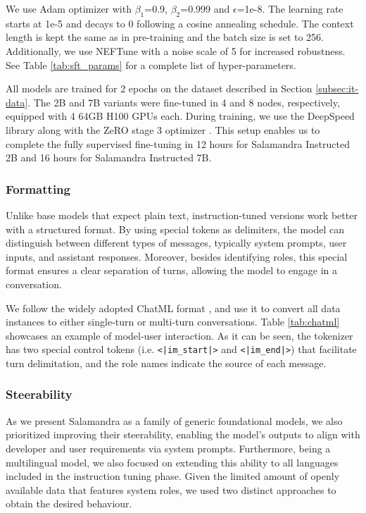 We use Adam optimizer with $\beta_1$=0.9, $\beta_2$=0.999 and $\epsilon$=1e-8. The learning rate starts at 1e-5 and decays to 0 following a cosine annealing schedule. The context length is kept the same as in pre-training and the batch size is set to 256. Additionally, we use NEFTune \cite{neftune} with a noise scale of 5 for increased robustness. See Table \ref{tab:sft_params} for a complete list of hyper-parameters.

All models are trained for 2 epochs on the dataset described in Section \ref{subsec:it-data}. The 2B and 7B variants were fine-tuned in 4 and 8 nodes, respectively, equipped with 4 64GB H100 GPUs each. During training, we use the DeepSpeed library \cite{deepspeed} along with the ZeRO stage 3 optimizer \cite{zero1, zero2, zero3}. This setup enables us to complete the fully supervised fine-tuning in 12 hours for Salamandra Instructed 2B and 16 hours for Salamandra Instructed 7B.

\subsubsection{Formatting}
\label{subsec:chatml}

Unlike base models that expect plain text, instruction-tuned versions work better with a structured format. By using special tokens as delimiters, the model can distinguish between different types of messages, typically system prompts, user inputs, and assistant responses. Moreover, besides identifying roles, this special format ensures a clear separation of turns, allowing the model to engage in a conversation.



We follow the widely adopted ChatML format \cite{chatml}, and use it to convert all data instances to either single-turn or multi-turn conversations. Table \ref{tab:chatml} showcases an example of model-user interaction. As it can be seen, the tokenizer has two special control tokens (i.e. \texttt{<|im\_start|>} and \texttt{<|im\_end|>}) that facilitate turn delimitation, and the role names indicate the source of each message.

\subsubsection{Steerability}
\label{subsec:steerability}
As we present Salamandra as a family of generic foundational models, we also prioritized improving their steerability, enabling the model’s outputs to align with developer and user requirements via system prompts. Furthermore, being a multilingual model, we also focused on extending this ability to all languages included in the instruction tuning phase. Given the limited amount of openly available data that features system roles, we used two distinct approaches to obtain the desired behaviour.

